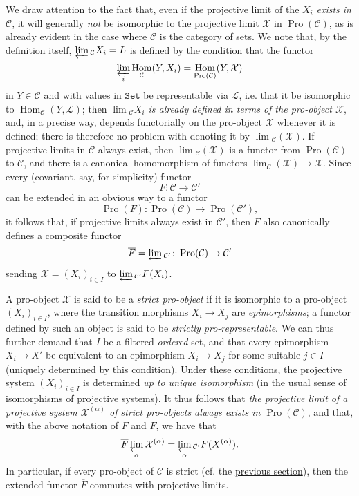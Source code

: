 \documentclass{article}
\renewcommand{\cal}[1]{{\mathcal{#1}}}
\newcommand{\Set}{\mathtt{Set}}
\DeclareMathOperator{\Hom}{Hom}
\DeclareMathOperator{\Pro}{Pro}
\newcommand{\oldpage}[1]{\marginpar{\footnotesize$\Big\vert$ \textit{p.~#1}}}
\begin{document}
We draw attention to the fact that, even if the projective limit of the $X_i$ \emph{exists in $\cal{C}$}, it will generally \emph{not} be isomorphic to the projective limit $\cal{X}$ in $\Pro(\cal{C})$, as is already evident in the case where $\cal{C}$ is the category of sets.
We note that, by the definition itself, $\varprojlim{}_{\cal{C}}X_i=L$ is defined by the condition that the functor
\[
  \varprojlim_i\Hom_{\cal{C}}(Y,X_i)=\Hom_{\Pro(\cal{C})}(Y,\cal{X})
\]
in $Y\in\cal{C}$ and with values in $\Set$ be representable via $\cal{L}$, i.e. that it be isomorphic to $\Hom_{\cal{C}}(Y,\cal{L})$;
then \emph{$\lim{}_{\cal{C}}X_i$ is already defined in terms of the \emph{pro-object} $\cal{X}$}, and, in a precise way, depends functorially on the pro-object $\cal{X}$ whenever it is defined;
there is therefore no problem with denoting it by $\lim{}_{\cal{C}}(\cal{X})$.
If projective limits in $\cal{C}$ always exist, then $\lim{}_{\cal{C}}(\cal{X})$ is a functor from $\Pro(\cal{C})$ to $\cal{C}$, and there is a canonical homomorphism of functors $\lim_\cal{C}(\cal{X})\to\cal{X}$.
Since every (covariant, say, for simplicity) functor
\[
  F\colon \cal{C} \to \cal{C}'
\]
can be extended in an obvious way to a functor
\[
  \Pro(F)\colon \Pro(\cal{C}) \to \Pro(\cal{C}'),
\]
it follows that, if projective limits always exist in $\cal{C}'$, then $F$ also canonically defines a composite functor
\[
  \overline{F} = \varprojlim{}_{\cal{C}'}\colon \Pro(\cal{C}) \to \cal{C}'
\]
sending $\cal{X}=(X_i)_{i\in I}$ to $\varprojlim{}_{\cal{C}'}F(X_i)$.

A pro-object $\cal{X}$ is said to be a \emph{strict pro-object} if it is isomorphic to a pro-object $(X_i)_{i\in I}$, where the transition morphisms $X_i\to X_j$ are \emph{epimorphisms};
a functor defined by such an object is said to be \emph{strictly pro-representable}.
We can thus further demand that $I$ be a filtered \emph{ordered} set, and that every epimorphism
\oldpage{195-05}
$X_i\to X'$ be equivalent to an epimorphism $X_i\to X_j$ for some suitable $j\in I$ (uniquely determined by this condition).
Under these conditions, the projective system $(X_i)_{i\in I}$ is determined \emph{up to unique isomorphism} (in the usual sense of isomorphisms of projective systems).
It thus follows that \emph{the projective limit of a projective system $\cal{X}^{(\alpha)}$ of strict pro-objects always exists in $\Pro(\cal{C})$}, and that, with the above notation of $F$ and $\overline{F}$, we have that
\[
  \overline{F}\varprojlim_\alpha\cal{X}^{(\alpha)} = \varprojlim_\alpha{}_{\cal{C}'}F(X^{(\alpha)}).
\]
In particular, if every pro-object of $\cal{C}$ is strict (cf. the \hyperref[A.1]{previous section}), then the extended functor $\overline{F}$ commutes with projective limits.
\end{document}
